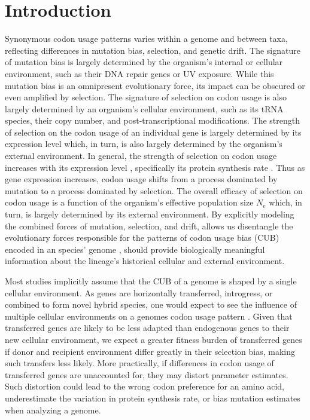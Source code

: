 \newpage


\section{Introduction}
Synonymous codon usage patterns varies within a genome and between taxa, reflecting differences in mutation bias, selection, and genetic drift.
The signature of mutation bias is largely determined by the organism's internal or cellular environment, such as their DNA repair genes or UV exposure.
While this mutation bias is an omnipresent evolutionary force, its impact can be obscured or even amplified by selection. 
The signature of selection on codon usage is also largely determined by an organism's cellular environment, such as its tRNA species, their copy number, and post-transcriptional modifications.
The strength of selection on the codon usage of an individual gene is largely determined by its expression level which, in turn, is also largely determined by the organism's external environment.
In general, the strength of selection on codon usage increases with its expression level \citep{gouy1982, ikemura1985, bulmer1990}, specifically its protein synthesis rate \citep{gilchrist2007}.
Thus as gene expression increases, codon usage shifts from a process dominated by mutation to a process dominated by selection.
The overall efficacy of selection on codon usage is a function of the organism's effective population size $N_e$ which, in turn, is largely determined by its external environment.
By explicitly modeling the combined forces of mutation, selection, and drift, \ROC allows us disentangle the evolutionary forces responsible for the patterns of codon usage bias (CUB) encoded in an species' genome \citep{gilchrist2007, ShahAndGilchrist2011, wallace2013, gilchrist2015}, should provide biologically meaningful information about the lineage's historical cellular and external environment.

Most studies implicitly assume that the CUB of a genome is shaped by a single cellular environment. 
As genes are horizontally transferred, introgress, or combined to form novel hybrid species, one would expect to see the influence of multiple cellular environments on a genomes codon usage pattern \citep{medigue1991,lawrence1997}.
Given that transferred genes are likely to be less adapted than endogenous genes to their new cellular environment, we expect a greater fitness burden of transferred genes if donor and recipient environment differ greatly in their selection bias, making such transfers less likely.
More practically, if differences in codon usage of transferred genes are unaccounted for, they may distort parameter estimates.
Such distortion could lead to the wrong codon preference for an amino acid, underestimate the variation in protein synthesis rate, or bias mutation estimates when analyzing a genome.

